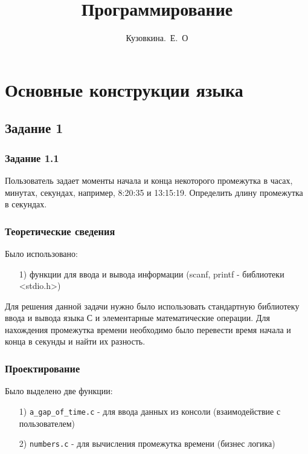 \documentclass[12pt,a4paper]{report}
\author{Кузовкина.~Е.~О}
\title{Программирование}
\begin{document}
\maketitle
\tableofcontents{}
\chapter{Основные конструкции языка}
\section{Задание 1}
\subsection{Задание 1.1}
Пользователь задает моменты начала и конца некоторого промежутка в часах, минутах, секундах, например, 8:20:35 и 13:15:19. Определить длину промежутка в секундах.
\subsection{Теоретические сведения}

Было использовано:
\begin{enumerate}
\item[1)] функции для ввода и вывода информации (scanf, printf - библиотеки <stdio.h>)

\end{enumerate}

Для решения данной задачи нужно было использовать стандартную библиотеку ввода и вывода языка С и элементарные математические операции. Для нахождения промежутка времени необходимо было перевести время начала и конца в секунды и найти их разность.

\subsection{Проектирование}

Было выделено две функции:
\begin{enumerate}
\item[1)]  \verb-a_gap_of_time.c- - для ввода данных из консоли (взаимодействие с пользователем)
\item[2)]  \verb-numbers.c- - для вычисления промежутка времени (бизнес логика)
\end{enumerate}
\end{document}
